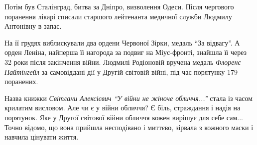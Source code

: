 Потім був Сталінград, битва за Дніпро, визволення Одеси. Після чергового
поранення лікарі списали старшого лейтенанта медичної служби Людмилу Антонівну
в запас.

На її грудях виблискували два ордени Червоної Зірки, медаль \enquote{За відвагу}. А
орден Леніна, найперша її нагорода за подвиг на Міус-фронті, знайшла її через
32 роки після закінчення війни. Людмилі Родіоновій вручена медаль \emph{Флоренс
Найтінгейл} за самовіддані дії у Другій світовій війні, під час порятунку 179
поранених.

Назва книжки \emph{Світлани Алексієвич \enquote{У війни не жіноче обличчя...}} стала із часом
крилатим висловом. Але чи є у війни обличчя? Є біль, страждання і надія на
порятунок. Яке у Другої світової війни обличчя кожен вирішує для себе сам...
Точно відомо, що вона прийшла несподівано і миттєво, зірвала з кожного маски і
навчила цінувати життя.
